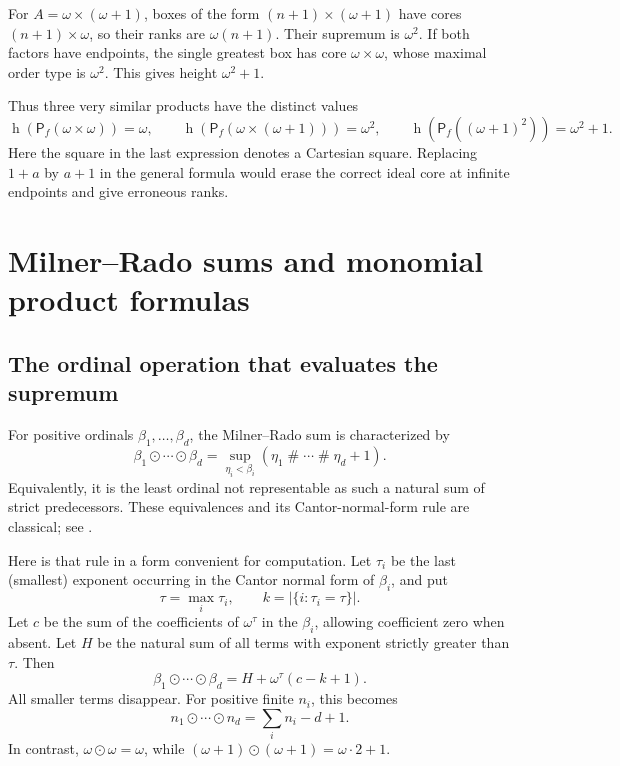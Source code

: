 \documentclass[11pt,letterpaper]{article}
\theoremstyle{teal}
\theoremstyle{definition}
\newcommand{\Pf}{\mathsf P_{\!f}}
\newcommand{\hgt}{\operatorname{h}}
\newcommand{\nsum}{\mathbin{\#}}
\newcommand{\MR}{\mathbin{\odot}}
\begin{document}
For $A=\omega\times(\omega+1)$, boxes of the form $(n+1)\times(\omega+1)$ have cores $(n+1)\times\omega$, so their ranks are $\omega(n+1)$. Their supremum is $\omega^2$. If both factors have endpoints, the single greatest box has core $\omega\times\omega$, whose maximal order type is $\omega^2$. This gives height $\omega^2+1$.

Thus three very similar products have the distinct values
\[
 \hgt(\Pf(\omega\times\omega))=\omega,\qquad
 \hgt(\Pf(\omega\times(\omega+1)))=\omega^2,\qquad
 \hgt(\Pf((\omega+1)^2))=\omega^2+1.
\]
Here the square in the last expression denotes a Cartesian square. Replacing $1+a$ by $a+1$ in the general formula would erase the correct ideal core at infinite endpoints and give erroneous ranks.

\section{Milner--Rado sums and monomial product formulas}
\subsection{The ordinal operation that evaluates the supremum}
For positive ordinals $\beta_1,\ldots,\beta_d$, the Milner--Rado sum is characterized by
\begin{equation}\label{eq:MRsup}
 \beta_1\MR\cdots\MR\beta_d
 =\sup_{\eta_i<\beta_i}(\eta_1\nsum\cdots\nsum\eta_d+1).
\end{equation}
Equivalently, it is the least ordinal not representable as such a natural sum of strict predecessors. These equivalences and its Cantor-normal-form rule are classical; see \cite[Definition~2.19 and Theorem~2.20]{Hilton}.

Here is that rule in a form convenient for computation. Let $\tau_i$ be the last (smallest) exponent occurring in the Cantor normal form of $\beta_i$, and put
\[
 \tau=\max_i\tau_i,\qquad
 k=|\{i:\tau_i=\tau\}|.
\]
Let $c$ be the sum of the coefficients of $\omega^\tau$ in the $\beta_i$, allowing coefficient zero when absent. Let $H$ be the natural sum of all terms with exponent strictly greater than $\tau$. Then
\begin{equation}\label{eq:MRcnf}
 \beta_1\MR\cdots\MR\beta_d=H+\omega^\tau(c-k+1).
\end{equation}
All smaller terms disappear. For positive finite $n_i$, this becomes
\[
 n_1\MR\cdots\MR n_d=\sum_i n_i-d+1.
\]
In contrast, $\omega\MR\omega=\omega$, while $(\omega+1)\MR(\omega+1)=\omega\cdot2+1$.
\end{document}
